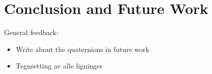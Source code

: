 \chapter{Conclusion and Future Work}

{\color{red}
General feedback:
\begin{itemize}
    \item Write about the quaternions in future work
    \item Tegnsetting av alle ligninger
\end{itemize}
}
